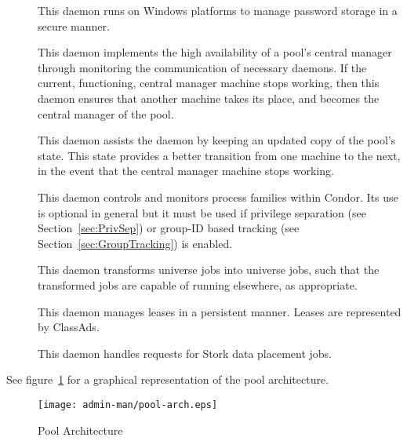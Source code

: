\begin{description}
\item[] This daemon
runs on Windows platforms to manage password storage in a secure manner.

\item[] This daemon
implements the high availability of a pool's central manager
through monitoring the communication of necessary daemons.
If the current, functioning, central manager machine
stops working, then this daemon ensures that another 
machine takes its place, and becomes the central manager of
the pool.

\item[] This daemon
assists the  daemon by keeping an updated copy of the
pool's state. This state provides a better transition
from one machine to the next, in the event 
that the central manager machine stops working.

\item[] This daemon
controls and monitors process families within Condor. Its use
is optional in general but it must be used if privilege separation
(see Section~\ref{sec:PrivSep}) or group-ID based tracking (see
Section~\ref{sec:GroupTracking}) is enabled.

\item[] This daemon 
transforms  universe jobs into 
universe jobs, such that the transformed jobs are capable
of running elsewhere, as appropriate.

\item[] This daemon 
manages leases in a persistent manner.
Leases are represented by ClassAds.

\item[] This daemon
handles requests for Stork data placement jobs.

\end{description} 


See figure~\ref{fig:pool-arch} for a graphical representation of the
pool architecture. 

\begin{figure}[hbt]
\centering
\texttt{[image: admin-man/pool-arch.eps]}
\caption{\label{fig:pool-arch}Pool Architecture}
\end{figure}
